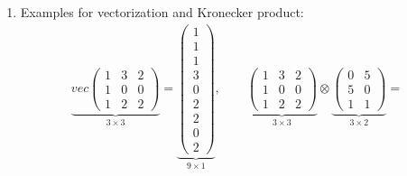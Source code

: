 \begin{enumerate}
\item
Examples for vectorization and Kronecker product:
\begin{align*}
\underbrace{vec\begin{pmatrix} 1&3&2\\1&0&0\\1&2&2 \end{pmatrix}}_{3\times3} = \underbrace{\begin{pmatrix} 1 \\1 \\1 \\3 \\0 \\2 \\2 \\ 0 \\2\end{pmatrix}}_{9\times1}, \qquad 
\underbrace{\begin{pmatrix} 1&3&2\\1&0&0\\1&2&2 \end{pmatrix}}_{3\times3} \otimes \underbrace{\begin{pmatrix}0&5\\5&0\\1&1 \end{pmatrix}}_{3\times2} =

\end{align*}
\end{enumerate}
